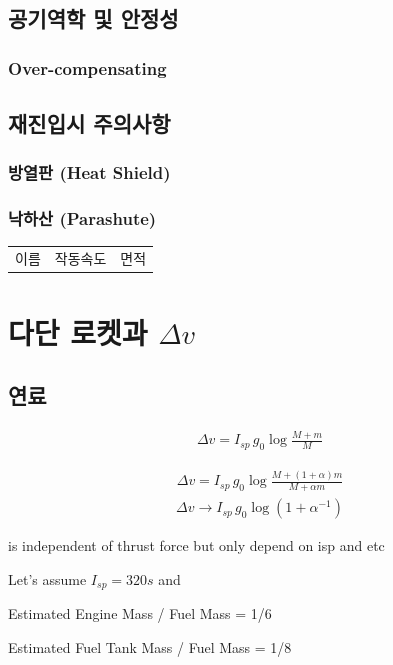\documentclass[9pt]{amsbook}
\begin{document}
\section{공기역학 및 안정성}
\subsection{Over-compensating}
\section{재진입시 주의사항}
\subsection{방열판 (Heat Shield)}
\subsection{낙하산 (Parashute)}

\begin{tabular}{|c|c|c|}
이름&작동속도&면적
\end{tabular}
\chapter{다단 로켓과 $\Delta v$}
\section{연료}

\begin{align}
    \Delta v =I_{sp}\, g_0\log\frac{M+m}{M}
\end{align}

\begin{align}
    \Delta v = I_{sp}\, g_0\log\frac{M+(1+\alpha) m}{M+\alpha m}
\end{align}
\begin{align}
    \Delta v \rightarrow I_{sp}\, g_0\log(1+\alpha^{-1})
\end{align}

is independent of thrust force but only depend on isp and etc

Let's assume $I_{sp} =320 s$ and 

Estimated Engine Mass / Fuel Mass = 1/6

Estimated Fuel Tank Mass / Fuel Mass = 1/8
\end{document}
